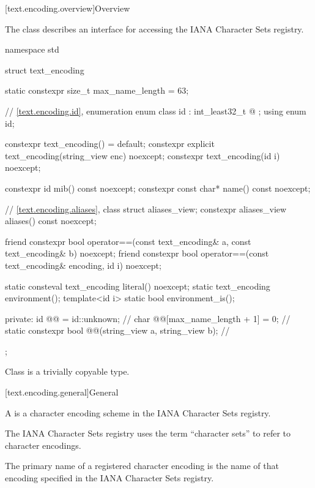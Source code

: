 [text.encoding.overview]{Overview}

\pnum
The class  describes an interface
for accessing the IANA Character Sets registry\supercite{iana-charset}.

%
\begin{codeblock}
namespace std {
  struct text_encoding {
    static constexpr size_t max_name_length = 63;

    // \ref{text.encoding.id}, enumeration 
    enum class id : int_least32_t {
      @\seebelow@
    };
    using enum id;

    constexpr text_encoding() = default;
    constexpr explicit text_encoding(string_view enc) noexcept;
    constexpr text_encoding(id i) noexcept;

    constexpr id mib() const noexcept;
    constexpr const char* name() const noexcept;

    // \ref{text.encoding.aliases}, class 
    struct aliases_view;
    constexpr aliases_view aliases() const noexcept;

    friend constexpr bool operator==(const text_encoding& a,
                                     const text_encoding& b) noexcept;
    friend constexpr bool operator==(const text_encoding& encoding, id i) noexcept;

    static consteval text_encoding literal() noexcept;
    static text_encoding environment();
    template<id i> static bool environment_is();

  private:
    id @@ = id::unknown;                                              // \expos
    char @@[max_name_length + 1] = {0};                              // \expos
    static constexpr bool @@(string_view a, string_view b);      // \expos
  };
}
\end{codeblock}

\pnum
Class  is
a trivially copyable type.

[text.encoding.general]{General}

\pnum
A  is
a character encoding scheme in the IANA Character Sets registry.
\begin{note}
The IANA Character Sets registry uses the term ``character sets''
to refer to character encodings.
\end{note}
The primary name of a registered character encoding is
the name of that encoding specified in the IANA Character Sets registry.

